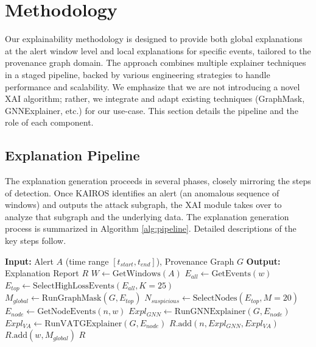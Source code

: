 \documentclass[conference]{IEEEtran}
\begin{document}
\section{Methodology}
Our explainability methodology is designed to provide both global explanations at the alert window level and local explanations for specific events, tailored to the provenance graph domain. The approach combines multiple explainer techniques in a staged pipeline, backed by various engineering strategies to handle performance and scalability. We emphasize that we are not introducing a novel XAI algorithm; rather, we integrate and adapt existing techniques (GraphMask, GNNExplainer, etc.) for our use-case. This section details the pipeline and the role of each component.

\subsection{Explanation Pipeline}
The explanation generation proceeds in several phases, closely mirroring the steps of detection. Once KAIROS identifies an alert (an anomalous sequence of windows) and outputs the attack subgraph, the XAI module takes over to analyze that subgraph and the underlying data. The explanation generation process is summarized in Algorithm \ref{alg:pipeline}. Detailed descriptions of the key steps follow.

\begin{algorithm}
\caption{Proposed XAI Framework Pipeline}
\label{alg:pipeline}
\begin{algorithmic}[1]
\STATE \textbf{Input:} Alert $A$ (time range $[t_{start}, t_{end}]$), Provenance Graph $G$
\STATE \textbf{Output:} Explanation Report $R$
\STATE $W \leftarrow \text{GetWindows}(A)$
    \STATE $E_{all} \leftarrow \text{GetEvents}(w)$
    \STATE $E_{top} \leftarrow \text{SelectHighLossEvents}(E_{all}, K=25)$
    \STATE $M_{global} \leftarrow \text{RunGraphMask}(G, E_{top})$
    \STATE $N_{suspicious} \leftarrow \text{SelectNodes}(E_{top}, M=20)$
        \STATE $E_{node} \leftarrow \text{GetNodeEvents}(n, w)$
        \STATE $Expl_{GNN} \leftarrow \text{RunGNNExplainer}(G, E_{node})$
        \STATE $Expl_{VA} \leftarrow \text{RunVATGExplainer}(G, E_{node})$
        \STATE $R.\text{add}(n, Expl_{GNN}, Expl_{VA})$
    \ENDFOR
    \STATE $R.\text{add}(w, M_{global})$
\ENDFOR
\RETURN $R$
\end{algorithmic}
\end{algorithm}
\end{document}
